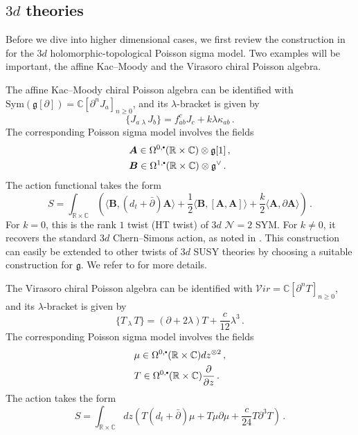 \documentclass[11pt]{article}
\newcommand{\C}{\mathbb{C}}
\newcommand{\R}{\mathbb{R}}
\newcommand\sbullet[1][.5]{\mathbin{\vcenter{\hbox{\scalebox{#1}{$\bullet$}}}}}
\numberwithin{equation}{section}
\begin{document}
\subsection{$3d$ theories}

Before we dive into higher dimensional cases, we first review the construction in \cite{khan2025poisson} for the $3d$ holomorphic-topological Poisson sigma model. Two examples will be important, the affine Kac--Moody and the Virasoro chiral Poisson algebra.

The affine Kac--Moody chiral Poisson algebra can be identified with $\mathrm{Sym}(\mathfrak{g}[\partial]) = \C[\partial^nJ_a]_{n\geq 0}$, and its $\lambda$-bracket is given by
\begin{equation}
	\{J_a\,_\lambda\, J_b\} = f_{ab}^c J_c + k\lambda\kappa_{ab}\,.
\end{equation}
The corresponding Poisson sigma model involves the fields 
\begin{equation}
	\begin{aligned}
		&\boldsymbol{A} \in \Omega^{0,\sbullet}(\R\times \C)\otimes \mathfrak{g}[1]\,,\\
		&\boldsymbol{B} \in \Omega^{1,\sbullet}(\R\times \C)\otimes \mathfrak{g}^{\vee}\,.
	\end{aligned}
\end{equation}
The action functional takes the form
\begin{equation}\label{eq:CS_HT}
	S = \int_{\mathbb R\times\mathbb C}\left( \langle \boldsymbol{B}, (d_t+\bar\partial)\boldsymbol{A} \rangle + \frac{1}{2} \langle \boldsymbol{B}, [\boldsymbol{A}, \boldsymbol{A}] \rangle + \frac{k}{2} \langle \boldsymbol{A}, \partial \boldsymbol{A} \rangle \right)\,.
\end{equation}
For $k = 0$, this is the rank $1$ twist (HT twist) of $3d$ $\mathcal{N} = 2$ SYM. For $k \neq 0$, it recovers the standard $3d$ Chern--Simons action, as noted in \cite{gwilliam2019one,costello2023boundary}. This construction can easily be extended to other twists of $3d$ SUSY theories by choosing a suitable construction for $\mathfrak{g}$. We refer to \cite{khan2025poisson,costello2019higgs} for more details.

The Virasoro chiral Poisson algebra can be identified with $\mathcal{V}ir = \C[\partial^n T]_{n\geq 0}$, and its $\lambda$-bracket is given by
\begin{equation}
	\{T\,_\lambda\, T\} = (\partial + 2\lambda)T + \frac{c}{12}\lambda^3\,.
\end{equation}
The corresponding Poisson sigma model involves the fields 
\begin{equation}
	\begin{aligned}
		&\mu \in \Omega^{0,\sbullet}(\mathbb R\times\mathbb C)dz^{\otimes 2}\,,\\
		&T \in \Omega^{0,\sbullet}(\mathbb R\times\mathbb C)\frac{\partial}{\partial z}\,.
	\end{aligned}
\end{equation}
The action takes the form
\begin{equation}
	S = \int_{\mathbb R\times\mathbb C} dz \left( T(d_t+\bar\partial)\mu + T\mu\partial\mu + \frac{c}{24} T\partial^3 T \right)\,.
\end{equation}
\end{document}
